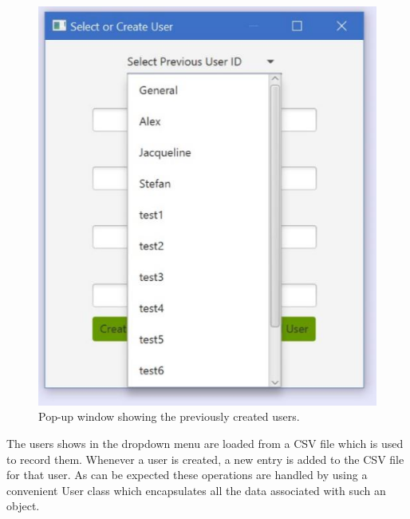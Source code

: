 \begin{figure}[H]
    \begin{minipage}{0.5\textwidth}
        \centering
        \includegraphics[scale=.55]{Figures/6_selectUserDropdown.JPG}%
        \caption{Pop-up window showing the previously created users.}
        \label{fig:selectOldUser}
    \end{minipage}
\end{figure}
The users shows in the dropdown menu are loaded from a CSV file which is used to record them. Whenever a user is created, a new entry is added to the CSV file for that user. As can be expected these operations are handled by using a convenient User class which encapsulates all the data associated with such an object. 

